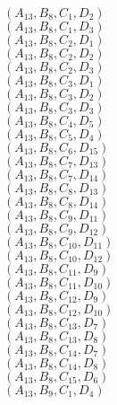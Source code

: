 \documentclass[14pt]{article}
\begin{document}
    $({A}_{13}, {B}_{8}, {C}_{1}, {D}_{2}) $ \\ 
    $({A}_{13}, {B}_{8}, {C}_{1}, {D}_{3}) $ \\ 
    $({A}_{13}, {B}_{8}, {C}_{2}, {D}_{1}) $ \\ 
    $({A}_{13}, {B}_{8}, {C}_{2}, {D}_{2}) $ \\ 
    $({A}_{13}, {B}_{8}, {C}_{2}, {D}_{3}) $ \\ 
    $({A}_{13}, {B}_{8}, {C}_{3}, {D}_{1}) $ \\ 
    $({A}_{13}, {B}_{8}, {C}_{3}, {D}_{2}) $ \\ 
    $({A}_{13}, {B}_{8}, {C}_{3}, {D}_{3}) $ \\ 
    $({A}_{13}, {B}_{8}, {C}_{4}, {D}_{5}) $ \\ 
    $({A}_{13}, {B}_{8}, {C}_{5}, {D}_{4}) $ \\ 
    $({A}_{13}, {B}_{8}, {C}_{6}, {D}_{15}) $ \\ 
    $({A}_{13}, {B}_{8}, {C}_{7}, {D}_{13}) $ \\ 
    $({A}_{13}, {B}_{8}, {C}_{7}, {D}_{14}) $ \\ 
    $({A}_{13}, {B}_{8}, {C}_{8}, {D}_{13}) $ \\ 
    $({A}_{13}, {B}_{8}, {C}_{8}, {D}_{14}) $ \\ 
    $({A}_{13}, {B}_{8}, {C}_{9}, {D}_{11}) $ \\ 
    $({A}_{13}, {B}_{8}, {C}_{9}, {D}_{12}) $ \\ 
    $({A}_{13}, {B}_{8}, {C}_{10}, {D}_{11}) $ \\ 
    $({A}_{13}, {B}_{8}, {C}_{10}, {D}_{12}) $ \\ 
    $({A}_{13}, {B}_{8}, {C}_{11}, {D}_{9}) $ \\ 
    $({A}_{13}, {B}_{8}, {C}_{11}, {D}_{10}) $ \\ 
    $({A}_{13}, {B}_{8}, {C}_{12}, {D}_{9}) $ \\ 
    $({A}_{13}, {B}_{8}, {C}_{12}, {D}_{10}) $ \\ 
    $({A}_{13}, {B}_{8}, {C}_{13}, {D}_{7}) $ \\ 
    $({A}_{13}, {B}_{8}, {C}_{13}, {D}_{8}) $ \\ 
    $({A}_{13}, {B}_{8}, {C}_{14}, {D}_{7}) $ \\ 
    $({A}_{13}, {B}_{8}, {C}_{14}, {D}_{8}) $ \\ 
    $({A}_{13}, {B}_{8}, {C}_{15}, {D}_{6}) $ \\ 
    $({A}_{13}, {B}_{9}, {C}_{1}, {D}_{4}) $ \\ 
\end{document}
